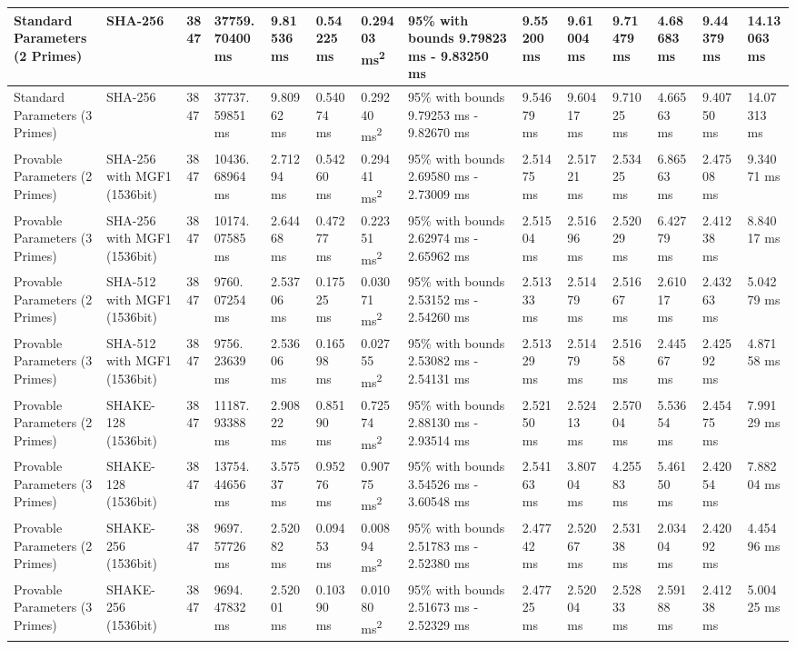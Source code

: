\documentclass[]{final_report}
\theoremstyle{definition}
\begin{document}
\begin{landscape}
\begin{longtable}{|p{2.3cm}|p{1.8cm}|p{1.0cm}|p{1.7cm}|p{1.4cm}|p{1.5cm}|p{1.8cm}|p{1.5cm}|p{1.43cm}|p{1.5cm}|p{1.3cm}|p{1.4cm}|p{1.3cm}|p{1.3cm}|}
\hline
\endlastfoot
Standard Parameters (2 Primes) & SHA-256 & 3847 & 37759.
70400 ms & 9.81536 ms & 0.54225 ms & 0.29403 ms\textsuperscript{2} & 95\% with bounds 9.79823 ms - 9.83250 ms & 9.55200 ms & 9.61004 ms & 9.71479 ms & 4.68683 ms & 9.44379 ms & 14.13063 ms \\
\hline
Standard Parameters (3 Primes) & SHA-256 & 3847 & 37737.
59851 ms & 9.80962 ms & 0.54074 ms & 0.29240 ms\textsuperscript{2} & 95\% with bounds 9.79253 ms - 9.82670 ms & 9.54679 ms & 9.60417 ms & 9.71025 ms & 4.66563 ms & 9.40750 ms & 14.07313 ms \\
\hline
Provable Parameters (2 Primes) & SHA-256 with MGF1 (1536bit) & 3847 & 10436.
68964 ms & 2.71294 ms & 0.54260 ms & 0.29441 ms\textsuperscript{2} & 95\% with bounds 2.69580 ms - 2.73009 ms & 2.51475 ms & 2.51721 ms & 2.53425 ms & 6.86563 ms & 2.47508 ms & 9.34071 ms \\
\hline
Provable Parameters (3 Primes) & SHA-256 with MGF1 (1536bit) & 3847 & 10174.
07585 ms & 2.64468 ms & 0.47277 ms & 0.22351 ms\textsuperscript{2} & 95\% with bounds 2.62974 ms - 2.65962 ms & 2.51504 ms & 2.51696 ms & 2.52029 ms & 6.42779 ms & 2.41238 ms & 8.84017 ms \\
\hline
Provable Parameters (2 Primes) & SHA-512 with MGF1 (1536bit) & 3847 & 9760.
07254 ms & 2.53706 ms & 0.17525 ms & 0.03071 ms\textsuperscript{2} & 95\% with bounds 2.53152 ms - 2.54260 ms & 2.51333 ms & 2.51479 ms & 2.51667 ms & 2.61017 ms & 2.43263 ms & 5.04279 ms \\
\hline
Provable Parameters (3 Primes) & SHA-512 with MGF1 (1536bit) & 3847 & 9756.
23639 ms & 2.53606 ms & 0.16598 ms & 0.02755 ms\textsuperscript{2} & 95\% with bounds 2.53082 ms - 2.54131 ms & 2.51329 ms & 2.51479 ms & 2.51658 ms & 2.44567 ms & 2.42592 ms & 4.87158 ms \\
\hline
Provable Parameters (2 Primes) & SHAKE-128 (1536bit) & 3847 & 11187.
93388 ms & 2.90822 ms & 0.85190 ms & 0.72574 ms\textsuperscript{2} & 95\% with bounds 2.88130 ms - 2.93514 ms & 2.52150 ms & 2.52413 ms & 2.57004 ms & 5.53654 ms & 2.45475 ms & 7.99129 ms \\
\hline
Provable Parameters (3 Primes) & SHAKE-128 (1536bit) & 3847 & 13754.
44656 ms & 3.57537 ms & 0.95276 ms & 0.90775 ms\textsuperscript{2} & 95\% with bounds 3.54526 ms - 3.60548 ms & 2.54163 ms & 3.80704 ms & 4.25583 ms & 5.46150 ms & 2.42054 ms & 7.88204 ms \\
\hline
Provable Parameters (2 Primes) & SHAKE-256 (1536bit) & 3847 & 9697.
57726 ms & 2.52082 ms & 0.09453 ms & 0.00894 ms\textsuperscript{2} & 95\% with bounds 2.51783 ms - 2.52380 ms & 2.47742 ms & 2.52067 ms & 2.53138 ms & 2.03404 ms & 2.42092 ms & 4.45496 ms \\
\hline
Provable Parameters (3 Primes) & SHAKE-256 (1536bit) & 3847 & 9694.
47832 ms & 2.52001 ms & 0.10390 ms & 0.01080 ms\textsuperscript{2} & 95\% with bounds 2.51673 ms - 2.52329 ms & 2.47725 ms & 2.52004 ms & 2.52833 ms & 2.59188 ms & 2.41238 ms & 5.00425 ms \\
\hline



\end{longtable}
\end{landscape}
\end{document}
